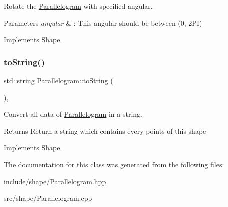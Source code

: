 Rotate the \hyperlink{classParallelogram}{Parallelogram} with specified angular. 


\begin{DoxyParams}{Parameters}
{\em angular} & \+: This angular should be between (0, 2\+PI) \\
\hline
\end{DoxyParams}


Implements \hyperlink{classShape_a2dea8616fd40f2d69fd208715921982a}{Shape}.

\mbox{\label{classParallelogram_a9caae0044f23d8a1e87b1a78d852c37f}} 
\subsubsection{\texorpdfstring{to\+String()}{toString()}}
{\footnotesize\ttfamily std\+::string Parallelogram\+::to\+String (\begin{DoxyParamCaption}{ }\end{DoxyParamCaption})\hspace{0.3cm}{\ttfamily [override]}, {\ttfamily [virtual]}}



Convert all data of \hyperlink{classParallelogram}{Parallelogram} in a string. 

\begin{DoxyReturn}{Returns}
Return a string which contains every points of this shape 
\end{DoxyReturn}


Implements \hyperlink{classShape_a98fa87c6dc4c7045fd6897a8f3bc186c}{Shape}.



The documentation for this class was generated from the following files\+:\begin{DoxyCompactItemize}
\item 
include/shape/\hyperlink{Parallelogram_8hpp}{Parallelogram.\+hpp}\item 
src/shape/Parallelogram.\+cpp\end{DoxyCompactItemize}
